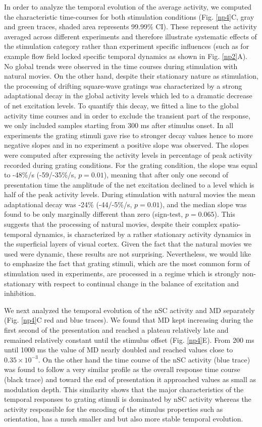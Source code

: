 In order to analyze the temporal evolution of the average activity, we
computed the characteristic time-courses for both stimulation conditions
(Fig. \ref{np4}C, gray and green traces, shaded area represents 99.99\% CI).
These represent the activity averaged across different experiments and
therefore illustrate systematic effects of the stimulation category rather
than experiment specific influences (such as for example flow field locked
specific temporal dynamics as shown in Fig. \ref{np2}A). No global trends were
observed in the time courses during stimulation with natural movies. On the
other hand, despite their stationary nature as stimulation, the processing
of drifting square-wave gratings was characterized by a strong adaptational
decay in the global activity levels which led to a dramatic decrease of net
excitation levels. To quantify this decay, we fitted a line to the global
activity time courses and in order to exclude the transient part of the
response, we only included samples starting from 300 ms after stimulus
onset. In all experiments the grating stimuli gave rise to stronger decay
values hence to more negative slopes and in no experiment a positive slope
was observed. The slopes were computed after expressing the activity levels
in percentage of peak activity recorded during grating conditions. For the
grating condition, the slope was equal to -48\%/s (-59/-35\%/s, $p =
0.01$), meaning that after only one second of presentation time the
amplitude of the net excitation declined to a level which is half of the
peak activity levels. During stimulation with natural movies the mean
adaptational decay was -24\% (-44/-5\%/s, $p = 0.01$), and the median slope
was found to be only marginally different than zero (sign-test, $p =
0.065$).  This suggests that the processing of natural movies, despite
their complex spatio-temporal dynamics, is characterized by a rather
stationary activity dynamics in the superficial layers of visual cortex.
Given the fact that the natural movies we used were dynamic, these results
are not surprising.  Nevertheless, we would like to emphasize the fact that
grating stimuli, which are the most common form of stimulation used in
experiments, are processed in a regime which is strongly non-stationary
with respect to continual change in the balance of excitation and
inhibition.

We next analyzed the temporal evolution of the nSC activity and MD
separately (Fig. \ref{np4}C red and blue traces). We found that MD kept
increasing during the first second of the presentation and reached a
plateau relatively late and remained relatively constant until the stimulus
offset (Fig. \ref{np4}E). From 200 ms until 1000 ms the value of MD
nearly doubled and reached values close to $0.35\times 10^{-3}$. On the
other hand the time course of the nSC activity (blue trace) was found to
follow a very similar profile as the overall response time course (black
trace) and toward the end of presentation it approached values as small as
modulation depth. This similarity shows that the major characteristics of
the temporal responses to grating stimuli is dominated by nSC activity
whereas the activity responsible for the encoding of the stimulus
properties such as orientation, has a much smaller and but also more stable
temporal evolution.


